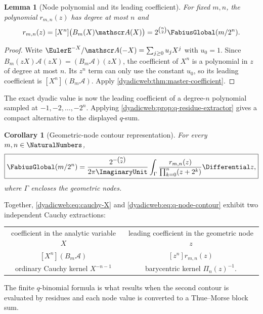 \documentclass[11pt,oneside]{article}
\newtheorem{lemma}[lemma]{Lemma}
\newtheorem{corollary}[corollary]{Corollary}
\theoremstyle{definition}
\theoremstyle{remark}
\begin{document}
\begin{lemma}[Node polynomial and its leading coefficient]
\label{dyadicweb:lem:Rmn-leading}
For fixed $m,n$, the polynomial $r_{m,n}(z)$ has degree at most $n$ and
\begin{equation}
 [z^n]r_{m,n}(z)=[X^n]\bigl(B_m(X)\mathscr A(X)\bigr)
 =2^{\binom n2}\FabiusGlobal(m/2^n).                         \label{dyadicweb:eq:Rmn-leading}
\end{equation}
\end{lemma}

\begin{proof}
Write
\(
 \EulerE^{-X}/\mathscr A(-X)=\sum_{j\ge0}u_jX^j
\)
with $u_0=1$.  Since
$B_m(zX)\mathscr A(zX)=(B_m\mathscr A)(zX)$, the coefficient of $X^n$ is a polynomial in $z$
of degree at most $n$.  Its $z^n$ term can only use the constant $u_0$, so its leading
coefficient is $[X^n](B_m\mathscr A)$.  Apply \cref{dyadicweb:thm:master-coefficient}.
\end{proof}

The exact dyadic value is now the leading coefficient of a degree-$n$ polynomial sampled at
$-1,-2,\ldots,-2^n$.  Applying \cref{dyadicweb:prop:q-residue-extractor} gives a compact alternative
to the displayed $q$-sum.

\begin{corollary}[Geometric-node contour representation]
\label{dyadicweb:cor:q-node-contour}
For every $m,n\in\NaturalNumbers$,
\begin{equation}
 \boxed{
 \FabiusGlobal(m/2^n)=
 \frac{2^{-\binom n2}}{2\pi\ImaginaryUnit}
 \int_\Gamma
 \frac{r_{m,n}(z)}{\prod_{k=0}^{n}(z+2^k)}\Differential z,}          \label{dyadicweb:eq:q-node-contour}
\end{equation}
where $\Gamma$ encloses the geometric nodes.
\end{corollary}

Together, \eqref{dyadicweb:eq:cauchy-X} and \eqref{dyadicweb:eq:q-node-contour} exhibit two independent Cauchy
extractions:
\begin{center}
\begin{tabular}{c@{\qquad}c}
coefficient in the analytic variable $X$
& leading coefficient in the geometric node $z$ \\
$[X^n](B_m\mathscr A)$
& $[z^n]r_{m,n}(z)$ \\
ordinary Cauchy kernel $X^{-n-1}$
& barycentric kernel $\Pi_n(z)^{-1}$.
\end{tabular}
\end{center}
The finite $q$-binomial formula is what results when the second contour is evaluated by
residues and each node value is converted to a Thue--Morse block sum.
\end{document}
